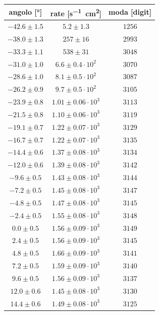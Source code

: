 \begin{table}[h]
\centering

\begin{tabular}{c|c|c}
angolo [\si{\degree}] & rate  [\si{s^{-1}cm^2}] & moda [digit] \\
\hline
$ -42.6 \pm 1.5 $ & $ 5.2 \pm 1.3 $ & $ 1256 $ \\ 
$ -38.0 \pm 1.3 $ & $ 257 \pm 16 $ & $ 2993 $ \\ 
$ -33.3 \pm 1.1 $ & $ 538 \pm 31 $ & $ 3048 $ \\ 
$ -31.0 \pm 1.0 $ & $ 6.6 \pm 0.4   \cdot 10^{2} $ & $ 3070 $ \\ 
$ -28.6 \pm 1.0 $ & $ 8.1 \pm 0.5   \cdot 10^{2} $ & $ 3087 $ \\ 
$ -26.2 \pm 0.9 $ & $ 9.7 \pm 0.5   \cdot 10^{2} $ & $ 3105 $ \\ 
$ -23.9 \pm 0.8 $ & $ 1.01 \pm 0.06 \cdot 10^{3} $ & $ 3113 $ \\ 
$ -21.5 \pm 0.8 $ & $ 1.10 \pm 0.06 \cdot 10^{3} $ & $ 3119 $ \\ 
$ -19.1 \pm 0.7 $ & $ 1.22 \pm 0.07 \cdot 10^{3} $ & $ 3129 $ \\ 
$ -16.7 \pm 0.7 $ & $ 1.22 \pm 0.07 \cdot 10^{3} $ & $ 3135 $ \\ 
$ -14.4 \pm 0.6 $ & $ 1.37 \pm 0.08 \cdot 10^{3} $ & $ 3134 $ \\ 
$ -12.0 \pm 0.6 $ & $ 1.39 \pm 0.08 \cdot 10^{3} $ & $ 3142 $ \\ 
$ -9.6 \pm 0.5 $ & $ 1.43 \pm 0.08  \cdot 10^{3} $ & $ 3144 $ \\ 
$ -7.2 \pm 0.5 $ & $ 1.45 \pm 0.08  \cdot 10^{3} $ & $ 3147 $ \\ 
$ -4.8 \pm 0.5 $ & $ 1.47 \pm 0.08  \cdot 10^{3} $ & $ 3145 $ \\ 
$ -2.4 \pm 0.5 $ & $ 1.55 \pm 0.08  \cdot 10^{3} $ & $ 3148 $ \\ 
$ 0.0 \pm 0.5 $ & $ 1.56 \pm 0.09   \cdot 10^{3} $ & $ 3149 $ \\ 
$ 2.4 \pm 0.5 $ & $ 1.56 \pm 0.09   \cdot 10^{3} $ & $ 3145 $ \\ 
$ 4.8 \pm 0.5 $ & $ 1.66 \pm 0.09   \cdot 10^{3} $ & $ 3141 $ \\ 
$ 7.2 \pm 0.5 $ & $ 1.59 \pm 0.09   \cdot 10^{3} $ & $ 3140 $ \\ 
$ 9.6 \pm 0.5 $ & $ 1.56 \pm 0.09   \cdot 10^{3} $ & $ 3137 $ \\ 
$ 12.0 \pm 0.6 $ & $ 1.45 \pm 0.08  \cdot 10^{3} $ & $ 3130 $ \\ 
$ 14.4 \pm 0.6 $ & $ 1.49 \pm 0.08  \cdot 10^{3} $ & $ 3125 $ \\ 

\end{tabular}
\end{table}
